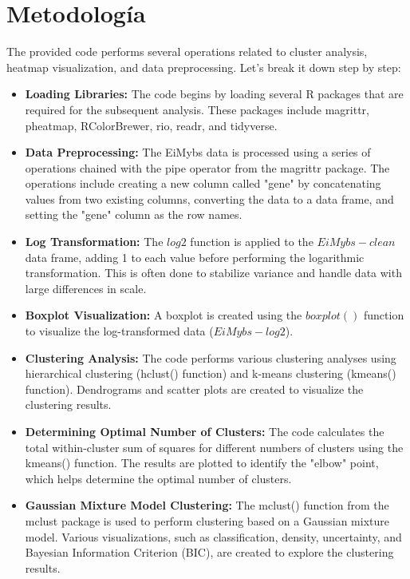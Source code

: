 \documentclass{article}
\begin{document}
 

\newpage
\section{Metodolog\'ia}

The provided code performs several operations related to cluster analysis, heatmap visualization, and data preprocessing. Let's break it down step by step:
\begin{itemize}

\item \textbf{Loading Libraries: } The code begins by loading several R packages that are required for the subsequent analysis. These packages include magrittr, pheatmap, RColorBrewer, rio, readr, and tidyverse.


\item \textbf{Data Preprocessing: } The EiMybs data is processed using a series of operations chained with the pipe operator from the magrittr package. The operations include creating a new column called "gene" by concatenating values from two existing columns, converting the data to a data frame, and setting the "gene" column as the row names.


\item \textbf{Log Transformation: } The $log2$ function is applied to the $EiMybs-clean$ data frame, adding 1 to each value before performing the logarithmic transformation. This is often done to stabilize variance and handle data with large differences in scale.

\item \textbf{Boxplot Visualization: } A boxplot is created using the $boxplot()$ function to visualize the log-transformed data ($EiMybs-log2$).

\item \textbf{Clustering Analysis: } The code performs various clustering analyses using hierarchical clustering (hclust() function) and k-means clustering (kmeans() function). Dendrograms and scatter plots are created to visualize the clustering results.

\item \textbf{Determining Optimal Number of Clusters:} The code calculates the total within-cluster sum of squares for different numbers of clusters using the kmeans() function. The results are plotted to identify the "elbow" point, which helps determine the optimal number of clusters.

\item \textbf{Gaussian Mixture Model Clustering:} The mclust() function from the mclust package is used to perform clustering based on a Gaussian mixture model. Various visualizations, such as classification, density, uncertainty, and Bayesian Information Criterion (BIC), are created to explore the clustering results.
\end{itemize}
\end{document}
